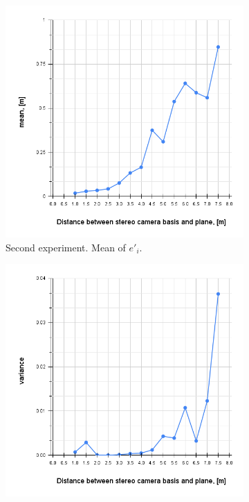 \begin{figure}[ht]
  \begin{subfigure}[ht]{.49\textwidth}
    \centering
    \includegraphics[width=\textwidth]{graphics/exp2_mean.png}
    \caption{Second experiment. Mean of $e'_i$.}
    \label{fig:exp_2_mean}
  \end{subfigure}
  \hfill
  \begin{subfigure}[ht]{0.49\textwidth}
    \centering
    \includegraphics[width=\textwidth]{graphics/exp2_var.png}

\end{subfigure}
\end{figure}
